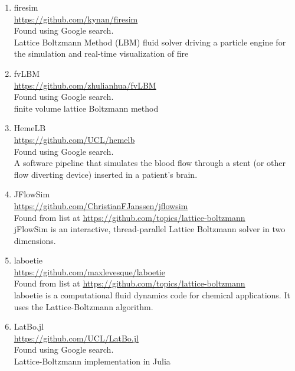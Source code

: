 \documentclass{article}
\begin{document}
\begin{enumerate}
	\item firesim \\ 
	\href{https://github.com/kynan/firesim}{https://github.com/kynan/firesim}
	\\
	Found using Google search.\\
	Lattice Boltzmann Method (LBM) fluid solver driving a particle engine for the simulation and real-time visualization of fire
	
	\item fvLBM
	\\
	\href{https://github.com/zhulianhua/fvLBM}{https://github.com/zhulianhua/fvLBM}
	\\
	Found using Google search.\\
	finite volume lattice Boltzmann method
	
	\item HemeLB \\
	\href{https://github.com/UCL/hemelb}{https://github.com/UCL/hemelb}
	\\
	Found using Google search.\\
	A software pipeline that simulates the blood flow through a stent (or other flow diverting device) inserted in a patient’s brain.
	
	\item JFlowSim \\
	\href{https://github.com/ChristianFJanssen/jflowsim}{https://github.com/ChristianFJanssen/jflowsim} \\
	Found from list at \href{https://github.com/topics/lattice-boltzmann}{https://github.com/topics/lattice-boltzmann}\\
	jFlowSim is an interactive, thread-parallel Lattice Boltzmann solver in two dimensions.
	
	\item laboetie
	\\
	\href{https://github.com/maxlevesque/laboetie}{https://github.com/maxlevesque/laboetie}
	\\
	Found from list at \href{https://github.com/topics/lattice-boltzmann}{https://github.com/topics/lattice-boltzmann}\\
	laboetie is a computational fluid dynamics code for chemical applications.
	It uses the Lattice-Boltzmann algorithm.
	
	\item LatBo.jl \\
	\href{https://github.com/UCL/LatBo.jl}{https://github.com/UCL/LatBo.jl}
	\\
	Found using Google search.\\
	Lattice-Boltzmann implementation in Julia
	

\end{enumerate}
\end{document}
